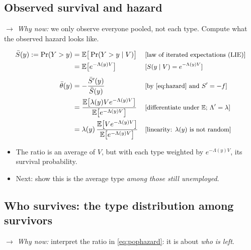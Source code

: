 \documentclass[11pt]{article}
\newcommand{\E}{\mathbb{E}}
\newcommand{\1}{\mathbf{1}}
\newcommand{\why}[1]{\text{\small[#1]}}
\newcommand{\whynow}[1]{\par\noindent\textit{$\rightarrow$ Why now:} #1\par}
\begin{document}
\subsection{Observed survival and hazard}
\whynow{we only observe everyone pooled, not each type. Compute what the observed hazard looks like.}
\begin{align}
  \bar S(y) := \Pr(Y>y) &= \E\big[\Pr(Y>y\mid V)\big] && \why{law of iterated expectations (LIE)} \nonumber\\
  &= \E\big[e^{-\Lambda(y)V}\big] && \why{$S(y\mid V)=e^{-\Lambda(y)V}$} \nonumber\\[4pt]
  \bar\theta(y) &= -\frac{\bar S'(y)}{\bar S(y)} && \why{by \eqref{eq:hazard} and $S'=-f$} \nonumber\\
  &= \frac{\E\big[\lambda(y)V e^{-\Lambda(y)V}\big]}{\E\big[e^{-\Lambda(y)V}\big]} && \why{differentiate under $\E$; $\Lambda'=\lambda$} \nonumber\\
  &= \lambda(y)\,\frac{\E\big[V e^{-\Lambda(y)V}\big]}{\E\big[e^{-\Lambda(y)V}\big]} && \why{linearity: $\lambda(y)$ is not random} \label{eq:pophazard}
\end{align}
\begin{itemize}
  \item The ratio is an average of $V$, but with each type weighted by $e^{-\Lambda(y)V}$, its survival probability.
  \item Next: show this is the average type \emph{among those still unemployed}.
\end{itemize}

\subsection{Who survives: the type distribution among survivors}
\whynow{interpret the ratio in \eqref{eq:pophazard}: it is about \emph{who is left}.}
\end{document}
